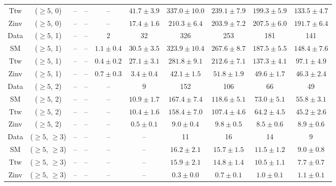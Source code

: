 \begin{table}[h!]
{\begin{tabular}{cccccccccc}
	Ttw & ($\ge5$, 0) & -- & -- & -- & $41.7\pm 3.9$ & $337.0\pm 10.0$ & $239.1\pm 7.9$ & $199.3\pm 5.9$ & $133.5\pm 4.7$ \\[0.5ex] 
	Zinv & ($\ge5$, 0) & -- & -- & -- & $17.4\pm 1.6$ & $210.3\pm 6.4$ & $203.9\pm 7.2$ & $207.5\pm 6.0$ & $191.7\pm 6.4$ \\[0.5ex] 
	Data & ($\ge5$, 1) & -- & -- & 2 & 32 & 326 & 253 & 181 & 141 \\[0.5ex] 
	SM & ($\ge5$, 1) & -- & -- & $1.1\pm 0.4$ & $30.5\pm 3.5$ & $323.9\pm 10.4$ & $267.6\pm 8.7$ & $187.5\pm 5.5$ & $148.4\pm 7.6$ \\[0.5ex] 
	Ttw & ($\ge5$, 1) & -- & -- & $0.4\pm 0.2$ & $27.1\pm 3.1$ & $281.8\pm 9.1$ & $212.6\pm 7.1$ & $137.3\pm 4.1$ & $97.1\pm 4.9$ \\[0.5ex] 
	Zinv & ($\ge5$, 1) & -- & -- & $0.7\pm 0.3$ & $3.4\pm 0.4$ & $42.1\pm 1.5$ & $51.8\pm 1.9$ & $49.6\pm 1.7$ & $46.3\pm 2.4$ \\[0.5ex] 
	Data & ($\ge5$, 2) & -- & -- & -- & 9 & 152 & 106 & 66 & 49 \\[0.5ex] 
	SM & ($\ge5$, 2) & -- & -- & -- & $10.9\pm 1.7$ & $167.4\pm 7.4$ & $118.6\pm 5.1$ & $73.0\pm 5.1$ & $55.8\pm 3.1$ \\[0.5ex] 
	Ttw & ($\ge5$, 2) & -- & -- & -- & $10.4\pm 1.6$ & $158.4\pm 7.0$ & $107.4\pm 4.6$ & $64.2\pm 4.5$ & $45.2\pm 2.6$ \\[0.5ex] 
	Zinv & ($\ge5$, 2) & -- & -- & -- & $0.5\pm 0.1$ & $9.0\pm 0.4$ & $9.8\pm 0.5$ & $8.5\pm 0.6$ & $8.9\pm 0.6$ \\[0.5ex] 
	Data & ($\ge5$, $\ge3$) & -- & -- & -- & -- & 11 & 16 & 14 & 9 \\[0.5ex] 
	SM & ($\ge5$, $\ge3$) & -- & -- & -- & -- & $16.2\pm 2.1$ & $15.7\pm 1.5$ & $11.5\pm 1.2$ & $9.0\pm 0.8$ \\[0.5ex] 
	Ttw & ($\ge5$, $\ge3$) & -- & -- & -- & -- & $15.9\pm 2.1$ & $14.8\pm 1.4$ & $10.5\pm 1.1$ & $7.7\pm 0.7$ \\[0.5ex] 
	Zinv & ($\ge5$, $\ge3$) & -- & -- & -- & -- & $0.3\pm 0.0$ & $0.7\pm 0.1$ & $1.0\pm 0.1$ & $1.1\pm 0.1$ \\[0.5ex] 
	\hline
	\hline
\end{tabular}}
\end{table}
